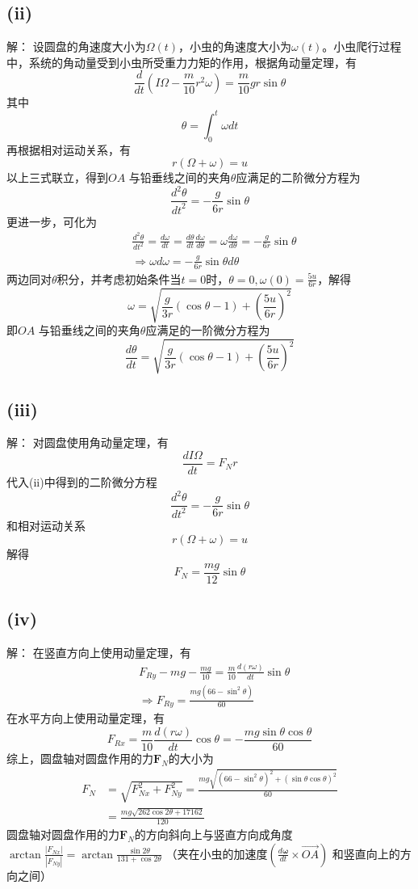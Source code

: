 \documentclass[10pt,a4paper]{article}
\theoremstyle{remark}
\begin{document}
\subsection*{(ii)}解：
设圆盘的角速度大小为$\Omega(t)$，小虫的角速度大小为$\omega(t)$。小虫爬行过程中，系统的角动量受到小虫所受重力力矩的作用，根据角动量定理，有
\[
\frac{d}{dt}(I\Omega - \frac{m}{10}r^2\omega) = \frac{m}{10}gr\sin\theta
\]
其中
\[
\theta = \int_0^t\omega dt
\]
再根据相对运动关系，有
\[
r(\Omega + \omega) = u
\]
以上三式联立，得到$OA$ 与铅垂线之间的夹角$\theta$应满足的二阶微分方程为
\[
\frac{d^2\theta}{{dt}^2} = -\frac{g}{6r}\sin\theta
\]
更进一步，可化为
\begin{align*}
&\frac{d^2\theta}{{dt}^2} = \frac{d\omega}{dt} = \frac{d\theta}{dt}\frac{d\omega}{d\theta} = \omega\frac{d\omega}{d\theta} = -\frac{g}{6r}\sin\theta\\
&\Longrightarrow\omega d\omega = -\frac{g}{6r}\sin\theta d\theta
\end{align*}
两边同对$\theta$积分，并考虑初始条件当$t = 0$时，$\theta = 0,\omega(0) = \frac{5u}{6r}$，解得
\[
\omega = \sqrt{\frac{g}{3r}(\cos\theta - 1) + (\frac{5u}{6r})^2}
\]
即$OA$ 与铅垂线之间的夹角$\theta$应满足的一阶微分方程为
\[
\frac{d\theta}{dt} = \sqrt{\frac{g}{3r}(\cos\theta - 1) + (\frac{5u}{6r})^2}
\]
\subsection*{(iii)}解：
对圆盘使用角动量定理，有
\[
\frac{dI\Omega}{dt} = F_Nr
\]
代入(ii)中得到的二阶微分方程
\[
\frac{d^2\theta}{{dt}^2} = -\frac{g}{6r}\sin\theta
\]
和相对运动关系
\[
r(\Omega + \omega) = u
\]
解得
\[
F_N = \frac{mg}{12}\sin\theta
\]
\subsection*{(iv)}解：
在竖直方向上使用动量定理，有
\begin{align*}
&F_{Ry} - mg - \frac{mg}{10} = \frac{m}{10}\frac{d(r\omega)}{dt}\sin\theta\\
&\Longrightarrow F_{Ry} = \frac{mg(66 - \sin^2\theta)}{60}
\end{align*}
在水平方向上使用动量定理，有
\[
F_{Rx} = \frac{m}{10}\frac{d(r\omega)}{dt}\cos\theta = -\frac{mg\sin\theta\cos\theta}{60}
\]
综上，圆盘轴对圆盘作用的力$\textbf{F}_N$的大小为
\begin{align*}
F_N &= \sqrt{F_{Nx}^2 + F_{Ny}^2} = \frac{mg\sqrt{(66 - \sin^2\theta)^2 + (\sin\theta\cos\theta)^2}}{60}\\
&= \frac{mg\sqrt{262\cos2\theta + 17162}}{120}
\end{align*}
圆盘轴对圆盘作用的力$\textbf{F}_N$的方向斜向上与竖直方向成角度$\arctan\frac{|F_{Nx}|}{|F_{Ny}|} = \arctan\frac{\sin2\theta}{131 + \cos2\theta}$ （夹在小虫的加速度$(\frac{d\bm{\omega}}{dt}\times\overrightarrow{OA})$ 和竖直向上的方向之间）
\end{document}
